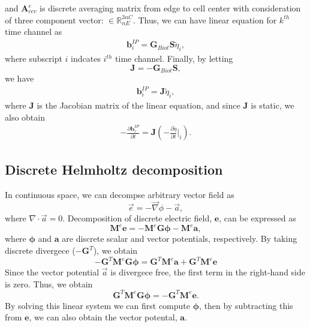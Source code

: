 \documentclass[a4paper, 11pt]{article}
\renewcommand{\div}{\nabla\cdot}
\newcommand{\grad}{\vec \nabla}
\newcommand{\dgrad}{{\mathbf G}}
\newcommand{\M}{{\mathbf M}}
\newcommand{\Me}{{\M^e}}
\newcommand {\e}  { {\vec e} }
\newcommand {\db}  { {\mathbf{b} } }
\newcommand {\de}  { {\mathbf{e} } }
\newcommand{\Gbiot}{\mathbf{G}_{Biot}}
\newcommand{\peta}{\tilde{\eta}}
\begin{document}
and $\mathbf{A}^{e}_{ccv}$ is discrete averaging matrix from edge to cell center with consideration of three component vector: $\in \mathbb{R}^{3nC}_{nE}$. 
Thus, we can have linear equation for $k^{th}$ time channel as
\begin{eqnarray*}
  \db^{IP}_i = \Gbiot \mathbf{S} \peta_i,
\end{eqnarray*}
where subscript $i$ indcates $i^{th}$ time channel. Finally, by letting
\begin{equation}
  \mathbf{J} = -\Gbiot\mathbf{S},
  \label{eq: Sense}
\end{equation}
we have
\begin{eqnarray}
  \db^{IP}_i = \mathbf{J}\peta_i,
  \label{eq: bIP_linear}
\end{eqnarray}
where $\mathbf{J}$ is the Jacobian matrix of the linear equation, and since $\mathbf{J}$ is static, we also obtain
\begin{eqnarray}
  -\frac{\partial\db^{IP}_i}{\partial t} = \mathbf{J}(-\frac{\partial \peta}{\partial t}\Big|_i).
  \label{eq: dbIPdt_linear}
\end{eqnarray}

\subsection{Discrete Helmholtz decomposition}
\label{section:helmholtz}
In continuous space, we can decompse arbitrary vector field as 
\begin{equation}
  \e = -\grad\phi -\vec{a},
\end{equation}
where $\div \vec{a} = 0$. 
Decomposition of discrete electric field, $\de$, can be expressed as
\begin{equation}
  \Me\de = -\Me\dgrad \boldsymbol{\phi} -\Me\mathbf{a},
\end{equation}
where $\boldsymbol{\phi}$ and $\mathbf{a}$ are discrete scalar and vector potentials, respectively. 
By taking discrete divergece ($-\dgrad^T$), we obtain
\begin{equation}
  -\dgrad^T\Me\dgrad\boldsymbol{\phi} = \dgrad^T\Me\mathbf{a} + \dgrad^T\Me\de
\end{equation}
Since the vector potential $\vec{a}$ is divergece free, the first term in the right-hand side is zero. Thus, we obtain
\begin{equation}
  \dgrad^T\Me\dgrad\boldsymbol{\phi} = -\dgrad^T\Me\de. 
\end{equation}
By solving this linear system we can first compute $\boldsymbol{\phi}$, then by subtracting this from $\de$, we can also obtain the vector potental, $\mathbf{a}$. 



\end{document}
